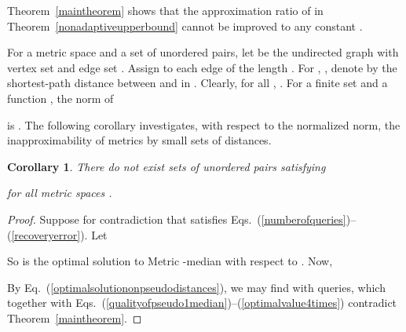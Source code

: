 \documentclass[letterpaper,12pt]{article}
\newtheorem{corollary}[theorem]{Corollary}
\newcommand{\comment}[1]{}
\begin{document}
{Theorem~\ref{maintheorem}
shows that
the approximation ratio of  in
Theorem~\ref{nonadaptiveupperbound} cannot be improved to any constant
.

\comment{For all  with ,

Clearly, this
and Eq.~(\ref{distancesonquerysetandbadvertices}) uniquely determines
 for all .

To complete specifying ,
for all  with , 

}


For a metric space  and a set 
of unordered pairs,
let  be the
undirected graph with
vertex set  and
edge set .
Assign to each edge
 of 
the
length .
For , , denote by  the
shortest-path distance between  and  in .
Clearly,  for all , .
For a finite set  and a function ,
the  norm of

is .
The following corollary investigates, with respect to the normalized
 norm, the
inapproximability of
metrics
by small sets of distances.

\begin{corollary}
There do not exist sets  of unordered pairs
satisfying

for all metric spaces .
\end{corollary}
\begin{proof}
Suppose for contradiction that  satisfies
Eqs.~(\ref{numberofqueries})--(\ref{recoveryerror}).
Let

So  is
the optimal solution to {\sc Metric -median} with respect to .
Now,

By Eq.~(\ref{optimalsolutiononpseudodistances}),
we may find  with  queries,
which together with
Eqs.~(\ref{qualityofpseudo1median})--(\ref{optimalvalue4times})
contradict Theorem~\ref{maintheorem}.
\end{proof}

\comment{\section{Additional section --- to be modified}

This section modifies XXX slightly to XXX.

\begin{figure}
\begin{algorithmic}[1]
\FOR{each }
	\FOR{each }
		\IF{, }
			\STATE Query for ;
			\STATE Query for ;
			\STATE ;
		\ELSE
			\STATE Query for ;
			\STATE ;
		\ENDIF
	\ENDFOR
\ENDFOR
\STATE ,
breaking ties arbitrarily;
\STATE Output ;
\end{algorithmic}
\caption{Algorithm {\sf Approx-Centroid}.}
\label{deterministic16approximationalgorithm}
\end{figure}


}}
\end{document}
